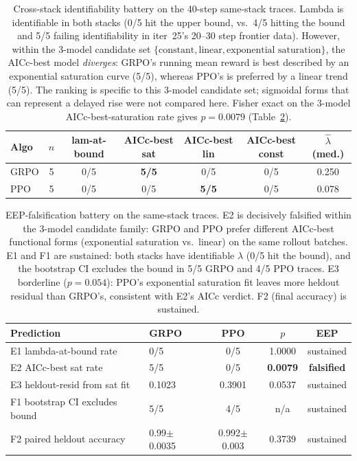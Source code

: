 \begin{table}[t]
\centering\small
\begin{tabular}{lcccccc}
\toprule
Algo & $n$ & lam-at-bound & AICc-best sat & AICc-best lin & AICc-best const & $\hat\lambda$ (med.) \\
\midrule
GRPO & 5 & 0/5 & \textbf{5/5} & 0/5 & 0/5 & 0.250 \\
PPO  & 5 & 0/5 & 0/5 & \textbf{5/5} & 0/5 & 0.078 \\
\bottomrule
\end{tabular}
\caption{Cross-stack identifiability battery on the 40-step same-stack
  traces. Lambda is identifiable in both stacks (0/5 hit the upper
  bound, vs.\ 4/5 hitting the bound and 5/5 failing identifiability in
  iter~25's 20--30 step frontier data). However, within the 3-model
  candidate set $\{\text{constant}, \text{linear}, \text{exponential
  saturation}\}$, the AICc-best model \emph{diverges}: GRPO's running
  mean reward is best described by an exponential saturation curve (5/5),
  whereas PPO's is preferred by a linear trend (5/5).  The ranking is
  specific to this 3-model candidate set; sigmoidal forms that can
  represent a delayed rise were not compared here.
  Fisher exact on the 3-model AICc-best-saturation rate gives
  $p=0.0079$ (Table~\ref{tab:iter29-eep}).}
\label{tab:iter29-cross-stack}
\end{table}

\begin{table}[t]
\centering\small
\begin{tabular}{llccc}
\toprule
Prediction & GRPO & PPO & $p$ & EEP \\
\midrule
E1 lambda-at-bound rate       & 0/5        & 0/5        & 1.0000  & sustained \\
E2 AICc-best sat rate         & 5/5        & 0/5        & \textbf{0.0079} & \textbf{falsified} \\
E3 heldout-resid from sat fit & 0.1023     & 0.3901     & 0.0537  & sustained \\
F1 bootstrap CI excludes bound & 5/5       & 4/5        & n/a     & sustained \\
F2 paired heldout accuracy     & 0.99$\pm$0.0035 & 0.992$\pm$0.003 & 0.3739 & sustained \\
\bottomrule
\end{tabular}
\caption{EEP-falsification battery on the same-stack traces.
  E2 is decisively falsified within the 3-model candidate family: GRPO
  and PPO prefer different AICc-best functional forms (exponential
  saturation vs.\ linear) on the same rollout batches.
  E1 and F1 are sustained: both stacks have identifiable $\lambda$ (0/5
  hit the bound), and the bootstrap CI excludes the bound in 5/5 GRPO
  and 4/5 PPO traces. E3 borderline ($p=0.054$): PPO's exponential
  saturation fit leaves more heldout residual than GRPO's, consistent
  with E2's AICc verdict. F2 (final accuracy) is sustained.}
\label{tab:iter29-eep}
\end{table}


